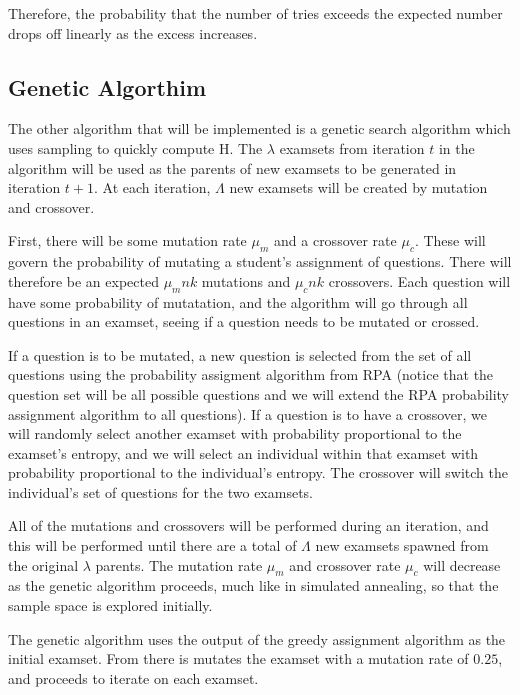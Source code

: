 \documentclass[psamsfonts]{amsart}
\begin{document}
Therefore, the probability that the number of tries exceeds the expected number drops off linearly as the excess increases.

\subsection{Genetic Algorthim}
 
The other algorithm that will be implemented is a genetic search algorithm which uses sampling to quickly compute $\mathrm{H}$. The $\lambda$ examsets from iteration $t$ in the algorithm will be used as the parents of new examsets to be generated in iteration $t+1$. At each iteration, $\Lambda$ new examsets will be created by mutation and crossover.

First, there will be some mutation rate $\mu_m$ and a crossover rate $\mu_c$. These will govern the probability of mutating a student's assignment of questions. There will therefore be an expected $\mu_m nk$ mutations and $\mu_c nk$ crossovers. Each question will have some probability of mutatation, and the algorithm will go through all questions in an examset, seeing if a question needs to be mutated or crossed. 

If a question is to be mutated, a new question is selected from the set of all questions using the probability assigment algorithm from RPA (notice that the question set will be all possible questions and we will extend the RPA probability assignment algorithm to all questions). If a question is to have a crossover, we will randomly select another examset with probability proportional to the examset's entropy, and we will select an individual within that examset with probability proportional to the individual's entropy. The crossover will switch the individual's set of questions for the two examsets. 

All of the mutations and crossovers will be performed during an iteration, and this will be performed until there are a total of $\Lambda$ new examsets spawned from the original $\lambda$ parents. The mutation rate $\mu_m$ and crossover rate $\mu_c$ will decrease as the genetic algorithm proceeds, much like in simulated annealing, so that the sample space is explored initially. 

The genetic algorithm uses the output of the greedy assignment algorithm as the initial examset. From there is mutates the examset with a mutation rate of $0.25$, and proceeds to iterate on each examset.
\end{document}

